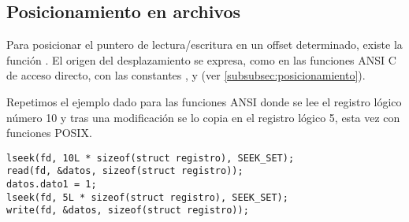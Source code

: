 \subsection{Posicionamiento en archivos}
Para posicionar el puntero de lectura/escritura en un offset determinado,
existe la función . El origen del desplazamiento se expresa, como en las
funciones ANSI C de acceso directo, con las constantes ,  y
 (ver \ref{subsubsec:posicionamiento}).

\begin{ejemplo}
Repetimos el ejemplo dado para las funciones ANSI donde se lee el registro
lógico número 10 y tras una modificación se lo copia en el registro lógico 5,
esta vez con funciones POSIX.
\begin{lstlisting}
lseek(fd, 10L * sizeof(struct registro), SEEK_SET);
read(fd, &datos, sizeof(struct registro));
datos.dato1 = 1;
lseek(fd, 5L * sizeof(struct registro), SEEK_SET);
write(fd, &datos, sizeof(struct registro));
\end{lstlisting}
\end{ejemplo}



